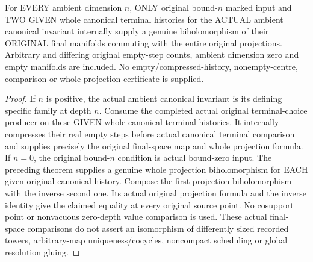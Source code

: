 \begin{theorem}
\label{hir:original-ambient-terminal-choices-all-dimensions}
\leanok
For EVERY ambient dimension $n$, ONLY original bound-$n$ marked input
and TWO GIVEN whole canonical terminal histories for the ACTUAL ambient
canonical invariant internally supply a genuine biholomorphism of their
ORIGINAL final manifolds commuting with the entire original projections.
Arbitrary and differing original empty-step counts, ambient dimension
zero and empty manifolds are included. No empty/compressed-history,
nonempty-centre, comparison or whole projection certificate is supplied.
\end{theorem}
\begin{proof}
If $n$ is positive, the actual ambient canonical invariant is its defining
specific family at depth $n$. Consume the completed actual original
terminal-choice producer on these GIVEN whole canonical terminal histories.
It internally compresses their real empty steps before actual canonical
terminal comparison and supplies precisely the original final-space map
and whole projection formula. If $n=0$, the original bound-$n$ condition
is actual bound-zero input. The preceding theorem supplies a genuine
whole projection biholomorphism for EACH given original canonical history.
Compose the first projection biholomorphism with the inverse second one.
Its actual original projection formula and the inverse identity give the
claimed equality at every original source point. No cosupport point or
nonvacuous zero-depth value comparison is used. These actual final-space
comparisons do not assert an isomorphism of differently sized recorded
towers, arbitrary-map uniqueness/cocycles, noncompact scheduling or global
resolution gluing.
\end{proof}
